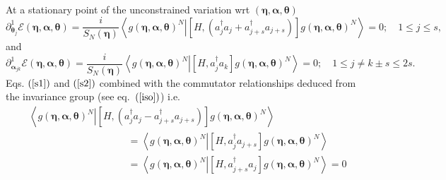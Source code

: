 \documentclass[aps,preprint]{revtex4}%
\begin{document}
At a stationary point of the unconstrained variation wrt $\left(
\boldsymbol{\eta},\boldsymbol{\alpha},\boldsymbol{\theta}\right)  $
\begin{equation}
\partial_{\boldsymbol{\theta}_{j}}^{1}\mathcal{E}\left(  \boldsymbol{\eta
},\boldsymbol{\alpha},\boldsymbol{\theta}\right)  =\frac{i}{S_{N}\left(
\boldsymbol{\eta}\right)  }\left\langle \left.  g\left(  \boldsymbol{\eta
},\boldsymbol{\alpha},\boldsymbol{\theta}\right)  ^{N}\right\vert \left[
H,\left(  a_{j}^{\dagger}a_{j}+a_{j+s}^{\dagger}a_{j+s}\right)  \right]
g\left(  \boldsymbol{\eta},\boldsymbol{\alpha},\boldsymbol{\theta}\right)
^{N}\right\rangle =0;\quad1\leq j\leq s, \label{s1}%
\end{equation}
and%
\begin{equation}
\partial_{\boldsymbol{\alpha}_{jk}}^{1}\mathcal{E}\left(  \boldsymbol{\eta
},\boldsymbol{\alpha},\boldsymbol{\theta}\right)  =\frac{i}{S_{N}\left(
\boldsymbol{\eta}\right)  }\left\langle \left.  g\left(  \boldsymbol{\eta
},\boldsymbol{\alpha},\boldsymbol{\theta}\right)  ^{N}\right\vert \left[
H,a_{j}^{\dagger}a_{k}\right]  g\left(  \boldsymbol{\eta},\boldsymbol{\alpha
},\boldsymbol{\theta}\right)  ^{N}\right\rangle =0;\quad1\leq j\neq k\pm
s\leq2s. \label{s2}%
\end{equation}
Eqs. $\left(  \ref{s1}\right)  $ and $\left(  \ref{s2}\right)  $ combined with
the commutator relationships deduced from the invariance group (see
eq.\ $\left(  \ref{iso}\right)  $) i.e.\
\begin{align}
&  \left\langle \left.  g\left(  \boldsymbol{\eta},\boldsymbol{\alpha
},\boldsymbol{\theta}\right)  ^{N}\right\vert \left[  H,\left(  a_{j}%
^{\dagger}a_{j}-a_{j+s}^{\dagger}a_{j+s}\right)  \right]  g\left(
\boldsymbol{\eta},\boldsymbol{\alpha},\boldsymbol{\theta}\right)
^{N}\right\rangle \nonumber\\
&  \qquad\qquad\qquad\qquad\qquad\left.  =\right.  \left\langle \left.
g\left(  \boldsymbol{\eta},\boldsymbol{\alpha},\boldsymbol{\theta}\right)
^{N}\right\vert \left[  H,a_{j}^{\dagger}a_{j+s}\right]  g\left(
\boldsymbol{\eta},\boldsymbol{\alpha},\boldsymbol{\theta}\right)
^{N}\right\rangle \nonumber\\
&  \qquad\qquad\qquad\qquad\qquad\left.  =\right.  \left\langle \left.
g\left(  \boldsymbol{\eta},\boldsymbol{\alpha},\boldsymbol{\theta}\right)
^{N}\right\vert \left[  H,a_{j+s}^{\dagger}a_{j}\right]  g\left(
\boldsymbol{\eta},\boldsymbol{\alpha},\boldsymbol{\theta}\right)
^{N}\right\rangle \left.  =\right.  0
\end{align}
\end{document}
